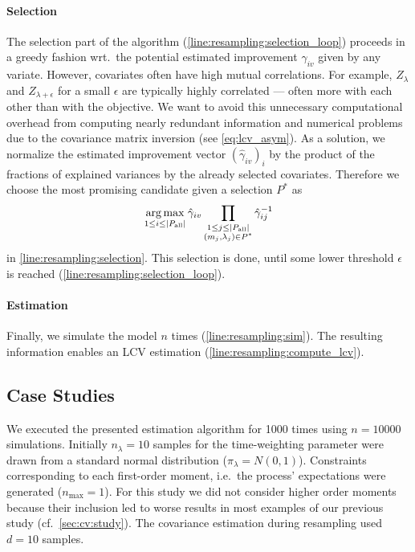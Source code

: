 \paragraph{Selection} The selection part of the algorithm (\autoref{line:resampling:selection_loop}) proceeds in a greedy fashion wrt.\ the potential estimated improvement $\hat{\gamma}_{iv}$ given by any variate.
However, covariates often have high mutual correlations.
For example, $Z_{\lambda}$ and $Z_{\lambda+\epsilon}$ for a small $\epsilon$ are typically highly correlated --- often more with each other than with the objective.
We want to avoid this unnecessary computational overhead from computing nearly redundant information and numerical problems due to the covariance matrix inversion (see \eqref{eq:lcv_asym}).
As a solution, we normalize the estimated improvement vector $(\hat{\gamma}_{iv})_i$ by
the product of the fractions of explained variances by the already selected covariates.
Therefore we choose the most promising candidate given a selection $P^{*}$ as
\begin{equation}
\operatorname*{arg\,max}_{1\leq i \leq \left|P_{\text{all}}\right|}
\hat{\gamma}_{iv}
    \prod_{\substack{1\leq j\leq {\left|P_{\text{all}}\right|}\\(m_j, \lambda_j)\in P^*}}
    \hat{\gamma}_{ij}^{-1}
\end{equation}
in \autoref{line:resampling:selection}.
This selection is done, until some lower threshold $\epsilon$ is reached (\autoref{line:resampling:selection_loop}).

\paragraph{Estimation} Finally, we simulate the model $n$ times (\autoref{line:resampling:sim}).
The resulting information enables an LCV estimation (\autoref{line:resampling:compute_lcv}).


\subsection{Case Studies}
We executed the presented estimation algorithm for \num{1000} times using $n=\num{10000}$ simulations.
Initially $n_{\lambda}=10$ samples for the time-weighting parameter were drawn from a standard normal distribution ($\pi_{\lambda} = N(0,1)$).
Constraints corresponding to each first-order moment, i.e.\ the process' expectations were generated ($n_{\max}=1$).
For this study we did not consider higher order moments because their inclusion led to worse results in most examples of our previous study (cf.\ \autoref{sec:cv:study}).
The covariance estimation during resampling used $d=10$ samples.

